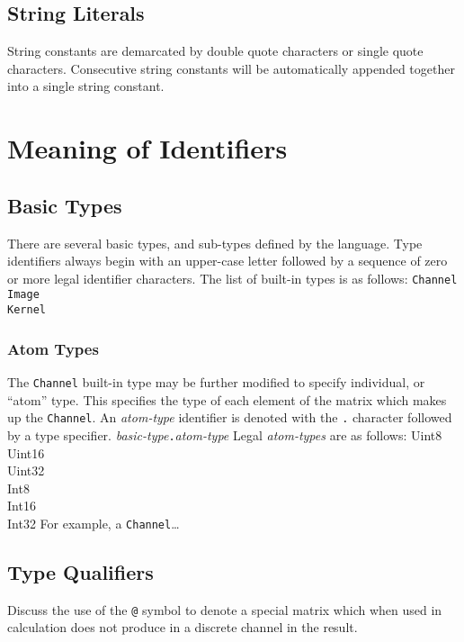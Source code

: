 \subsection{String Literals}
\label{ssec:strings}

String constants are demarcated by double quote characters or single
quote characters. Consecutive string constants will be automatically
appended together into a single string constant.

\section{Meaning of Identifiers}
\label{sec:identmeaning}

\subsection{Basic Types}
\label{ssec:types}
There are several basic types, and sub-types defined by the \sys{} language.
Type identifiers always begin with an upper-case letter followed by a sequence
of zero or more legal identifier characters. The list of built-in types is as follows:
\startsyn
\texttt{Channel} \\
\texttt{Image} \\
\texttt{Kernel}
\stopsyn

\subsubsection{Atom Types}
\label{sssec:subtypes}
The \texttt{Channel} built-in type may be further modified to specify
individual, or ``atom'' type. This specifies the type of each element of the
matrix which makes up the \texttt{Channel}. An \emph{atom-type} identifier
is denoted with the \texttt{.} character followed by a type specifier.
\startsyn
\emph{basic-type}\texttt{.}\emph{atom-type}
\stopsyn
Legal \emph{atom-types} are as follows:
\startsyn
Uint8 \\
Uint16 \\
Uint32 \\
Int8 \\
Int16 \\
Int32
\stopsyn
For example, a \texttt{Channel}\ldots

\subsection{Type Qualifiers}
\label{ssec:typequal}
Discuss the use of the \texttt{@} symbol to denote a special matrix which when used
in calculation does not produce in a discrete channel in the result.

